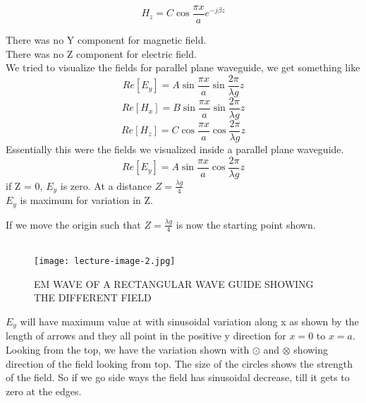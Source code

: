 \begin{equation}
	H_{z} = C\cos \dfrac{\pi x}{a} e^{-j\beta z}
\end{equation}

	There was no Y component for magnetic field.\\
	There was no Z component for electric field.\\ 
 	We tried to visualize the fields for parallel plane waveguide, we get something like \\
\begin{equation}
	Re[E_{y}] = A\sin\dfrac{\pi x}{a} \sin\dfrac{2\pi}{\lambda g}z
\end{equation}	
\begin{equation}
	Re[H_{x}] = B\sin\dfrac{\pi x}{a} \sin\dfrac{2\pi}{\lambda g}z
\end{equation}
\begin{equation}
	Re[H_{z}] = C\cos\dfrac{\pi x}{a} \cos\dfrac{2\pi}{\lambda g}z
\end{equation}
	Essentially this were the fields we visualized inside a
	parallel plane waveguide.
\begin{equation}
	Re[E_{y}] = A\sin\dfrac{\pi x}{a} \cos\dfrac{2\pi}{\lambda g}z
\end{equation}
	if Z = 0, $E_{y}$ is zero. At a distance $ Z = \frac{\lambda g}{4}$\\
	
	$E_{y}$ is maximum for variation in Z.
	
	If we move the origin such that $Z = \frac{\lambda g}{4}$ is now the starting point shown.\\\\
	
	\begin{figure}[H]
		\centering
		\texttt{[image: lecture-image-2.jpg]}
		\caption{EM WAVE OF A RECTANGULAR WAVE GUIDE SHOWING THE DIFFERENT FIELD}
	\end{figure}


	
	$E_{y}$ will have maximum value at   with sinusoidal variation along x as shown 
	by the length of arrows and they all point in the 
	positive y direction for $x = 0$ to $x = a$. Looking from the top, we have the variation shown with $\odot$ and $\otimes$ showing direction of the field looking from top.
 	The size of the circles shows the strength of the field. So if we go side ways the field has sinusoidal decrease, till it gets to zero at the edges.
 	

